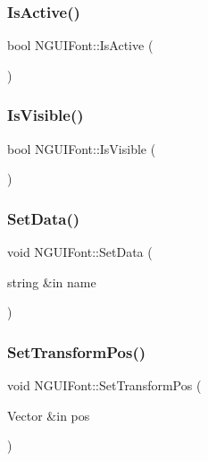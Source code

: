 \subsubsection{\texorpdfstring{Is\+Active()}{IsActive()}}
{\footnotesize\ttfamily bool N\+G\+U\+I\+Font\+::\+Is\+Active (\begin{DoxyParamCaption}{ }\end{DoxyParamCaption})}

\hypertarget{class_n_g_u_i_font_abfa4ac4453a46933e200dd49b6f24ead}{}\label{class_n_g_u_i_font_abfa4ac4453a46933e200dd49b6f24ead} 
\subsubsection{\texorpdfstring{Is\+Visible()}{IsVisible()}}
{\footnotesize\ttfamily bool N\+G\+U\+I\+Font\+::\+Is\+Visible (\begin{DoxyParamCaption}{ }\end{DoxyParamCaption})}

\hypertarget{class_n_g_u_i_font_a96011fe5345a52a71cd75cf16fc75081}{}\label{class_n_g_u_i_font_a96011fe5345a52a71cd75cf16fc75081} 
\subsubsection{\texorpdfstring{Set\+Data()}{SetData()}}
{\footnotesize\ttfamily void N\+G\+U\+I\+Font\+::\+Set\+Data (\begin{DoxyParamCaption}\item[{string \&in}]{name }\end{DoxyParamCaption})}

\hypertarget{class_n_g_u_i_font_a95c1abc42d5df4a850b11f344dd311a4}{}\label{class_n_g_u_i_font_a95c1abc42d5df4a850b11f344dd311a4} 
\subsubsection{\texorpdfstring{Set\+Transform\+Pos()}{SetTransformPos()}}
{\footnotesize\ttfamily void N\+G\+U\+I\+Font\+::\+Set\+Transform\+Pos (\begin{DoxyParamCaption}\item[{Vector \&in}]{pos }\end{DoxyParamCaption})}


